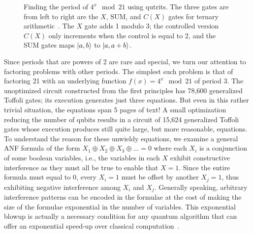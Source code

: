 \documentclass[sigplan,screen]{acmart}
\theoremstyle{definition}
\begin{document}
\begin{figure}
  \centering
\caption{\label{fig:shor21}Finding the period of $4^x \mod{21}$ using
  qutrits. The three gates are from left to right are the $X$,
  $\textrm{SUM}$, and $C(X)$ gates for ternary
  arithmetic~\cite{10.5555/3179473.3179481}. The $X$ gate adds 1
  modulo 3; the controlled version $C(X)$ only increments when the
  control is equal to 2, and the \textrm{SUM} gates maps $\ket{a,b}$
  to $\ket{a,a+b}$.}
\end{figure}
Since periods that are powers of 2 are rare and special, we turn our
attention to factoring problems with other periods. The simplest such
problem is that of factoring 21 with an underlying function
$f(x) = 4^x \mod{21}$ of period 3. The unoptimized circuit constructed
from the first principles has 78,600 generalized Toffoli gates; its
execution generates just three equations. But even in this rather
trivial situation, the equations span 5 pages of text!  A small
optimization reducing the number of qubits results in a circuit of
15,624 generalized Toffoli gates whose execution produces still quite
large, but more reasonable, equations. To understand the reason for
these unwieldy equations, we examine a general ANF formula of the form
$ X_1 \oplus X_2 \oplus X_3 \oplus \ldots = 0$ where each $X_i$ is a
conjunction of some boolean variables, i.e., the variables in each $X$
exhibit constructive interference as they must all be true to enable
that $X=1$. Since the entire formula must equal to 0, every $X_i = 1$
must be offset by another $X_j = 1$, thus exhibiting negative
interference among $X_i$ and $X_j$. Generally speaking, arbitrary
interference patterns can be encoded in the formulae at the cost of
making the size of the formulae exponential in the number of
variables. This exponential blowup is actually a necessary condition
for any quantum algorithm that can offer an exponential speed-up over
classical computation~\cite{10.2307/3560059}.
\end{document}
